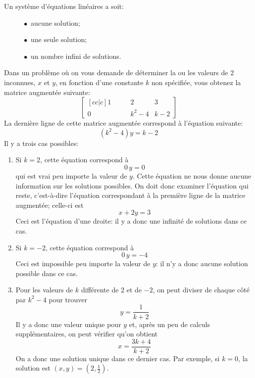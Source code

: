 \begin{NotProof}
Un système d'équations linéaires a soit:
\begin{itemize}
\item[$\quad\scriptstyle\bullet$] aucune solution;
\item[$\quad\scriptstyle\bullet$] une seule solution;
\item[$\quad\scriptstyle\bullet$] un nombre infini de solutions.
\end{itemize}
\leavevmode %
\end{NotProof}

\begin{Example}
Dans un problème où on vous demande de déterminer la ou les valeurs de 2 inconnues, $x$ et $y$,
en fonction d'une constante $k$ non spécifiée,
vous obtenez la matrice augmentée suivante:
\[
\begin{bmatrix}[cc|c]
1 \qquad& 2 & 3 \\
0 \qquad& k^2 - 4 & k-2
\end{bmatrix}
\]
La dernière ligne de cette matrice augmentée
correspond à l'équation suivante:
\[
(k^2 - 4)y = k-2
\]
Il y a trois cas possibles:
\begin{enumerate}
\item Si $k=2$, cette équation correspond à
$$0\,y = 0$$ qui est vrai peu importe la valeur de $y$. Cette équation ne nous donne aucune information sur les solutions possibles. On doit donc examiner l'équation qui reste, c'est-à-dire l'équation correspondant à la première ligne de la matrice augmentée; celle-ci est
\[
x + 2y = 3
\]
Ceci est l'équation d'une droite: il y a donc une
infinité de solutions dans ce cas.
\item Si $k=-2$, cette équation correspond à
$$0\,y = -4$$ Ceci est impossible peu importe la valeur de $y$: il n'y a donc aucune solution possible dans ce cas.
\item Pour les valeurs de $k$ différente de $2$ et de $-2$, on peut diviser de chaque côté par $k^2 -4$ pour trouver
\[
y = \frac{1}{k+2}
\]
Il y a donc une valeur unique pour $y$ et, après un peu de calculs supplémentaires, on peut vérifier qu'on obtient
\[
x = \frac{3k+4}{k+2}
\]
On a donc une solution unique dans ce dernier cas.  Par exemple, si $k=0$, la solution est $(x, y) = (2, \frac12)$.
\end{enumerate}
\leavevmode %
\end{Example}